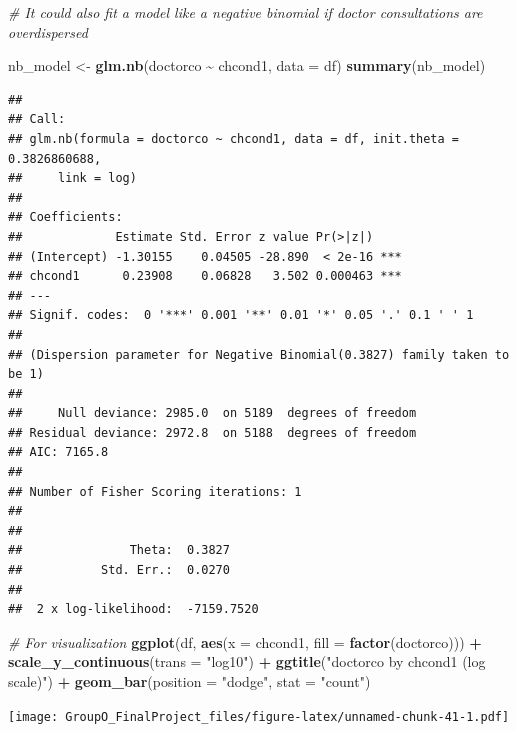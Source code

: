 \documentclass[
]{article}
\newenvironment{Shaded}{\begin{snugshade}}{\end{snugshade}}
\newcommand{\AttributeTok}[1]{\textcolor[rgb]{0.13,0.29,0.53}{#1}}
\newcommand{\CommentTok}[1]{\textcolor[rgb]{0.56,0.35,0.01}{\textit{#1}}}
\newcommand{\FunctionTok}[1]{\textcolor[rgb]{0.13,0.29,0.53}{\textbf{#1}}}
\newcommand{\NormalTok}[1]{#1}
\newcommand{\OtherTok}[1]{\textcolor[rgb]{0.56,0.35,0.01}{#1}}
\newcommand{\SpecialCharTok}[1]{\textcolor[rgb]{0.81,0.36,0.00}{\textbf{#1}}}
\newcommand{\StringTok}[1]{\textcolor[rgb]{0.31,0.60,0.02}{#1}}
\begin{document}
\begin{Shaded}
\begin{Highlighting}[]
\CommentTok{\# It could also fit a model like a negative binomial if doctor consultations are overdispersed}

\NormalTok{nb\_model }\OtherTok{\textless{}{-}} \FunctionTok{glm.nb}\NormalTok{(doctorco }\SpecialCharTok{\textasciitilde{}}\NormalTok{ chcond1, }\AttributeTok{data =}\NormalTok{ df)}
\FunctionTok{summary}\NormalTok{(nb\_model)}
\end{Highlighting}
\end{Shaded}

\begin{verbatim}
## 
## Call:
## glm.nb(formula = doctorco ~ chcond1, data = df, init.theta = 0.3826860688, 
##     link = log)
## 
## Coefficients:
##             Estimate Std. Error z value Pr(>|z|)    
## (Intercept) -1.30155    0.04505 -28.890  < 2e-16 ***
## chcond1      0.23908    0.06828   3.502 0.000463 ***
## ---
## Signif. codes:  0 '***' 0.001 '**' 0.01 '*' 0.05 '.' 0.1 ' ' 1
## 
## (Dispersion parameter for Negative Binomial(0.3827) family taken to be 1)
## 
##     Null deviance: 2985.0  on 5189  degrees of freedom
## Residual deviance: 2972.8  on 5188  degrees of freedom
## AIC: 7165.8
## 
## Number of Fisher Scoring iterations: 1
## 
## 
##               Theta:  0.3827 
##           Std. Err.:  0.0270 
## 
##  2 x log-likelihood:  -7159.7520
\end{verbatim}

\begin{Shaded}
\begin{Highlighting}[]
\CommentTok{\# For visualization}
\FunctionTok{ggplot}\NormalTok{(df, }\FunctionTok{aes}\NormalTok{(}\AttributeTok{x =}\NormalTok{ chcond1, }\AttributeTok{fill =} \FunctionTok{factor}\NormalTok{(doctorco))) }\SpecialCharTok{+} 
  \FunctionTok{scale\_y\_continuous}\NormalTok{(}\AttributeTok{trans =} \StringTok{"log10"}\NormalTok{) }\SpecialCharTok{+}
  \FunctionTok{ggtitle}\NormalTok{(}\StringTok{"\textquotesingle{}doctorco\textquotesingle{} by \textquotesingle{}chcond1\textquotesingle{} (log scale)"}\NormalTok{) }\SpecialCharTok{+}
  \FunctionTok{geom\_bar}\NormalTok{(}\AttributeTok{position =} \StringTok{"dodge"}\NormalTok{, }\AttributeTok{stat =} \StringTok{"count"}\NormalTok{)}
\end{Highlighting}
\end{Shaded}

\texttt{[image: GroupO\_FinalProject\_files/figure-latex/unnamed-chunk-41-1.pdf]}
\end{document}
